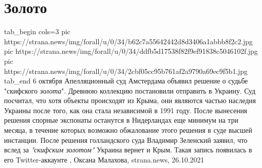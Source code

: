  
 
 
 
 
\chapter{Золото}

\ifcmt
tab_begin cols=3
  pic https://strana.news/img/forall/u/0/34/b62c7a55642442d8d3406a1abbb8f2c2.jpg
	pic https://strana.news/img/forall/u/0/34/ddfb5d17538f82f9ef91838c5046102f.jpg
	pic https://strana.news/img/forall/u/0/34/2cbf05cc95b761af2a9790a69ec9f5b1.jpg
tab_end
\fi
6 октября Апелляционный суд Амстердама объявил решение о судьбе "скифского
\emph{золота}". Древнюю коллекцию постановили отправить в Украину.  Суд
посчитал, что хотя объекты происходят из Крыма, они являются частью наследия
Украины после того, как она стала независимой в 1991 году.  После вынесения
решения спорные экспонаты останутся в Нидерландах еще минимум на три месяца, в
течение которых возможно обжалование этого решения в суде высшей инстанции.
После решения голландского суда Владимир Зеленский заявил, что вслед за
\emph{"скифским золотом"} Украина вернет и Крым. Такая запись появилась в его
Twitter-аккаунте
, 
Оксана Малахова, strana.news, 26.10.2021

